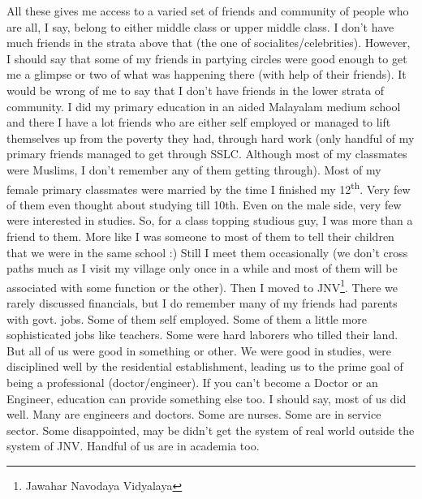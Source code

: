 {All these gives me access to a varied set of friends and community of people who are all, I say, 
belong to either middle class or upper middle class. I don't have much friends in the strata above 
that (the one of socialites/celebrities). However, I should say that some of my friends in partying circles 
were good enough to get me a glimpse or two of what was happening there (with help of their friends). 
It would be wrong of me to say that I don't have friends in the lower strata of community. I did my primary education 
in an aided Malayalam medium school and there I have a lot friends who are either self employed 
or managed to lift themselves up from the poverty they had, through hard work (only handful of my 
primary friends managed to get through SSLC. Although most of my classmates were Muslims, I don't 
remember any of them getting through). Most of my female primary classmates were married by the time 
I finished my 12\textsuperscript{th}. Very few of them even thought about studying till 10th. Even on the male side, 
very few were interested in studies. So, for a class topping studious guy, I was more than a friend 
to them. More like I was someone to most of them to tell their children that we were in the same school :) Still 
I meet them occasionally (we don't cross paths much as I visit my village only once in a while 
and most of them will be associated with some function or the other). Then I moved to JNV\footnote{Jawahar Navodaya Vidyalaya}. There we rarely discussed financials, but I do remember many of my friends had
parents with govt. jobs. Some of them self employed. Some of them a little more sophisticated jobs
like teachers. Some were hard laborers who tilled their land. But all of us were good in something 
or other. We were good in
studies, were disciplined well by the residential establishment, leading us to the prime goal of 
being a professional (doctor/engineer). If you can't become a Doctor or an Engineer, education can provide something else too. I should say, most of us did well. Many are engineers and doctors. Some are nurses. 
Some are in service sector. Some disappointed, may be didn't get the system of real world outside 
the system of JNV. Handful of us are in academia too. 

}

